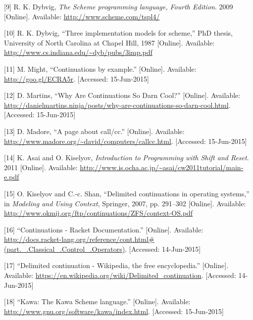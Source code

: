 \documentclass[12pt,a4paper,oneside,openright]{book}
\begin{document}
{
{[}9{]} R. K. Dybvig, \emph{The Scheme programming language, Fourth
Edition}. 2009 {[}Online{]}. Available:
\url{http://www.scheme.com/tspl4/}

{[}10{]} R. K. Dybvig, ``Three implementation models for scheme,''
PhD thesis, University of North Carolina at Chapel Hill, 1987
{[}Online{]}. Available:
\url{http://www.cs.indiana.edu/~dyb/pubs/3imp.pdf}

{[}11{]} M. Might, ``Continuations by example.'' {[}Online{]}.
Available: \url{http://goo.gl/ECRA5r}. {[}Accessed: 15-Jun-2015{]}

{[}12{]} D. Martins, ``Why Are Continuations So Darn Cool?''
{[}Online{]}. Available:
\url{http://danielmartins.ninja/posts/why-are-continuations-so-darn-cool.html}.
{[}Accessed: 15-Jun-2015{]}

{[}13{]} D. Madore, ``A page about call/cc.'' {[}Online{]}. Available:
\url{http://www.madore.org/~david/computers/callcc.html}. {[}Accessed:
15-Jun-2015{]}

{[}14{]} K. Asai and O. Kiselyov, \emph{Introduction to Programming with
Shift and Reset}. 2011 {[}Online{]}. Available:
\url{http://www.is.ocha.ac.jp/~asai/cw2011tutorial/main-e.pdf}

{[}15{]} O. Kiselyov and C.-c. Shan, ``Delimited continuations in
operating systems,'' in \emph{Modeling and Using Context}, Springer,
2007, pp. 291--302 {[}Online{]}. Available:
\url{http://www.okmij.org/ftp/continuations/ZFS/context-OS.pdf}

{[}16{]} ``Continuations - Racket Documentation.'' {[}Online{]}.
Available:
\url{http://docs.racket-lang.org/reference/cont.html\#(part._.Classical_.Control_.Operators)}.
{[}Accessed: 14-Jun-2015{]}

{[}17{]} ``Delimited continuation - Wikipedia, the free encyclopedia.''
{[}Online{]}. Available:
\url{https://en.wikipedia.org/wiki/Delimited_continuation}. {[}Accessed:
14-Jun-2015{]}

{[}18{]} ``Kawa: The Kawa Scheme language.'' {[}Online{]}. Available:
\url{http://www.gnu.org/software/kawa/index.html}. {[}Accessed:
15-Jun-2015{]}

}
\end{document}
